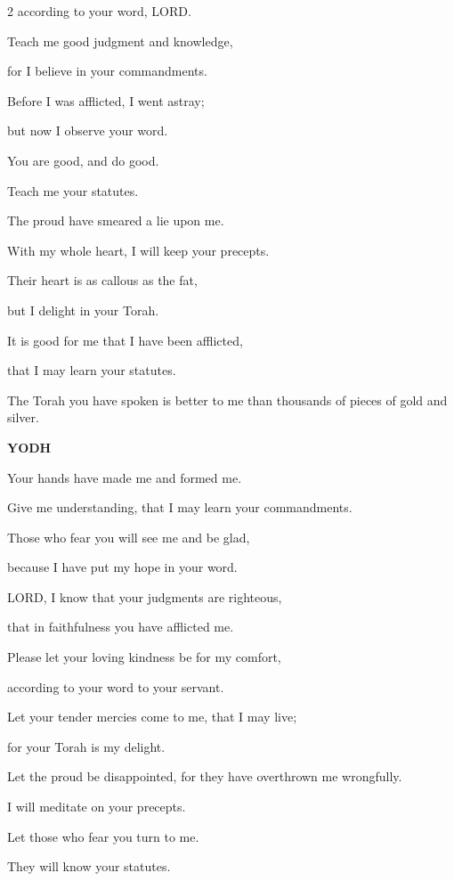 \begin{multicols}{2}
	according to your word, LORD.
	
	
	\myverse{}Teach me good judgment and knowledge,
	
	for I believe in your commandments.
	
	
	\myverse{}Before I was afflicted, I went astray;
	
	but now I observe your word.
	
	
	\myverse{}You are good, and do good.
	
	Teach me your statutes.
	
	
	\myverse{}The proud have smeared a lie upon me.
	
	With my whole heart, I will keep your precepts.
	
	
	\myverse{}Their heart is as callous as the fat,
	
	but I delight in your Torah.
	
	
	\myverse{}It is good for me that I have been afflicted,
	
	that I may learn your statutes.
	
	
	\myverse{}The Torah you have spoken is better to me than thousands of
	pieces of gold and silver.
	
	\vspace{\baselineskip}
	\textbf{YODH}
	
	
	\myverse{}Your hands have made me and formed me.
	
	Give me understanding, that I may learn your commandments.
	
	
	\myverse{}Those who fear you will see me and be glad,
	
	because I have put my hope in your word.
	
	
	\myverse{}LORD, I know that your judgments are righteous,
	
	that in faithfulness you have afflicted me.
	
	
	\myverse{}Please let your loving kindness be for my comfort,
	
	according to your word to your servant.
	
	
	\myverse{}Let your tender mercies come to me, that I may live;
	
	for your Torah is my delight.
	
	
	\myverse{}Let the proud be disappointed, for they have overthrown me
	wrongfully.
	
	I will meditate on your precepts.
	
	
	\myverse{}Let those who fear you turn to me.
	
	They will know your statutes.
	

\end{multicols}
